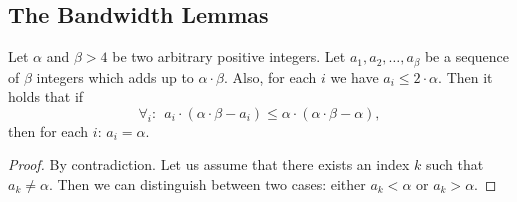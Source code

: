 \documentclass[conference,10pt]{IEEEtran}
\newcommand{\maciek}[1]{\textcolor{brown}{maciek: #1}}
\newcommand{\clauses}{\alpha}
\newcommand{\variables}{\beta}
\begin{document}
\begin{appendix}
%
%
%
%
%
%
\section{The Bandwidth Lemmas}


\begin{lemma}\label{lem:bandwidth-lemma}
  Let $\clauses$ and $\variables > 4$ be two arbitrary positive integers. Let $a_1, a_2, \ldots,
  a_{\variables}$ be a sequence of $\variables$ integers which adds up to $\clauses \cdot \variables$. Also, for
  each $i$ we have $a_i \leq 2 \cdot \clauses$. Then it holds that if
  $$ \forall_i:~~ a_i \cdot (\clauses \cdot \variables - a_i) \leq \clauses \cdot (\clauses \cdot \variables -
  \clauses), $$
\noindent  then for each $i$: $a_i = \clauses$.
\end{lemma}
\begin{proof}
  By contradiction. Let us assume
that there exists an index $k$ such that
$a_k \neq \clauses$. Then we can distinguish between two cases:
either $a_k<\clauses$ or
$a_k>\clauses$.


\end{proof}
\end{appendix}
\end{document}
